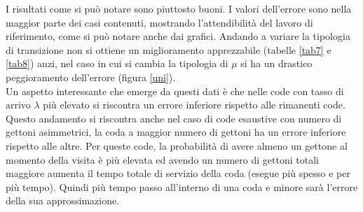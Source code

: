 \documentclass[12pt,a4paper,italian]{article}
\begin{document}
I risultati come si può notare sono piuttosto buoni. I valori dell'errore sono nella maggior parte dei casi contenuti, mostrando l'attendibilità del lavoro di riferimento, come si può notare anche dai grafici. Andando a variare la tipologia di transizione non si ottiene un miglioramento apprezzabile (tabelle \ref{tab7} e \ref{tab8}) anzi, nel caso in cui si cambia la tipologia di $\mu$ si ha un drastico peggioramento dell'errore (figura \ref{uni}).\\
Un aspetto interessante che emerge da questi dati è che nelle code con tasso di arrivo $\lambda$ più elevato si riscontra un errore inferiore rispetto alle rimanenti code.
Questo andamento si riscontra anche nel caso di code esaustive con numero di gettoni asimmetrici, la coda a maggior numero di gettoni ha un errore inferiore rispetto alle altre. Per queste code, la probabilità di avere almeno un gettone al momento della visita è più elevata ed avendo un numero di gettoni totali maggiore aumenta il tempo totale di servizio della coda (esegue più spesso e per più tempo).
Quindi più tempo passo all'interno di una coda e minore sarà l'errore della sua approssimazione.
\newpage
\end{document}
